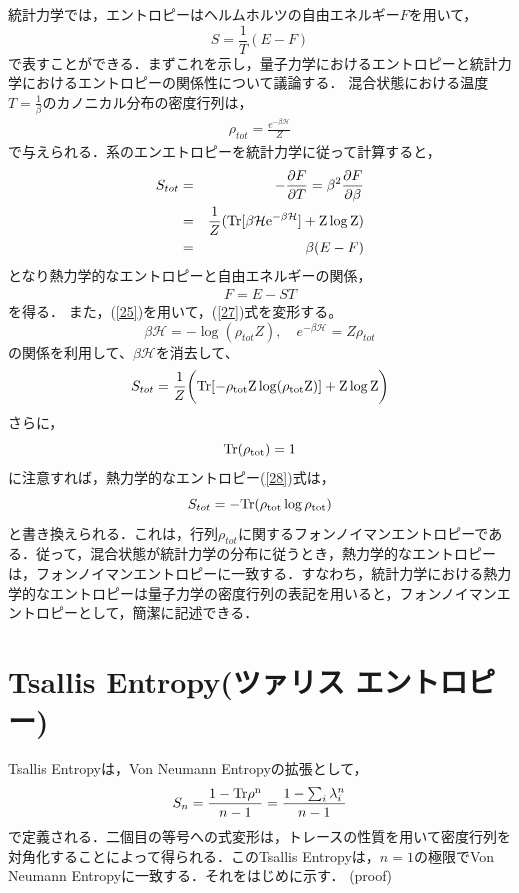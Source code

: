 統計力学では，エントロピーはヘルムホルツの自由エネルギー$F$を用いて，
\begin{equation}
  S=\frac{1}{T}(E-F)
\end{equation}
で表すことができる．まずこれを示し，量子力学におけるエントロピーと統計力学におけるエントロピーの関係性について議論する．
混合状態における温度$T=\frac{1}{\beta}$のカノニカル分布の密度行列は，
\begin{eqnarray}
\label{25}
\rho_{tot}=\frac{e^{-\beta \mathcal{H}}}{Z}
\end{eqnarray}
で与えられる．系のエンエトロピーを統計力学に従って計算すると，
\begin{eqnarray}
S_{tot}&=&-\frac{\partial F}{\partial T}=\beta^2\frac{\partial F}{\partial \beta} \\
\label{27}
&=&\frac{1}{Z}(\rm{Tr}[\beta\mathcal{H}e^{-\beta \mathcal{H}}]+Z\log Z) \\
\label{28}
&=&\beta(E-F)
\end{eqnarray}
となり熱力学的なエントロピーと自由エネルギーの関係，
\begin{eqnarray}
F=E-ST
\end{eqnarray}
を得る．
また，(\ref{25})を用いて，(\ref{27})式を変形する。
\begin{equation}
  \beta\mathcal{H}= -\log(\rho_{tot}Z), \quad e^{-\beta\mathcal{H}} = Z\rho_{tot}
\end{equation}
の関係を利用して、$\beta\mathcal{H}$を消去して、
\begin{equation}
  S_{tot}=\frac{1}{Z}\biggl(\rm{Tr}[-\rho_{tot}Z\log(\rho_{tot}Z)]+Z\log Z\biggr)
\end{equation}
さらに，
\begin{equation}
  \rm{Tr}(\rho_{tot})=1
\end{equation}
に注意すれば，熱力学的なエントロピー(\ref{28})式は，
\begin{equation}
  S_{tot}=-\rm{Tr}(\rho_{tot}\log\rho_{tot})
\end{equation}と書き換えられる．これは，行列$\rho_{tot}$に関するフォンノイマンエントロピーである．従って，混合状態が統計力学の分布に従うとき，熱力学的なエントロピーは，フォンノイマンエントロピーに一致する．すなわち，統計力学における熱力学的なエントロピーは量子力学の密度行列の表記を用いると，フォンノイマンエントロピーとして，簡潔に記述できる．

\section{Tsallis Entropy(ツァリス エントロピー)}
Tsallis Entropyは，Von Neumann Entropyの拡張として，
\begin{align}
  S_{n}=\frac{1-\rm{Tr}\rho^n}{n-1}=\frac{1-\sum_{i}\lambda_{i}^n}{n-1}
\end{align}
で定義される．二個目の等号への式変形は，トレースの性質を用いて密度行列を対角化することによって得られる．このTsallis Entropyは，$n=1$の極限でVon Neumann Entropyに一致する．それをはじめに示す．
(proof)

